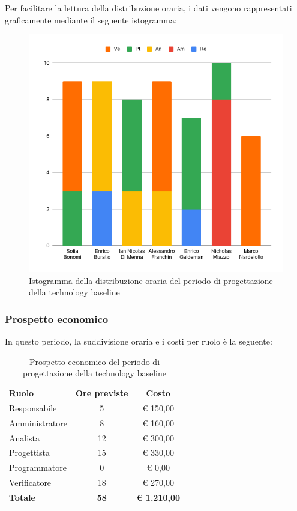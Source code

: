 \documentclass[../piano-di-progetto.tex]{subfiles}
\begin{document}
  Per facilitare la lettura della distribuzione oraria, i dati vengono rappresentati graficamente mediante il seguente istogramma:
  \begin{figure}[H]
    \centering
    \includegraphics[width=12cm]{img/ore-progettazione.png}
    \caption{Istogramma della distribuzione oraria del periodo di progettazione della technology baseline}
    \label{fig:ore-componente-progettazione}
  \end{figure}

  \subsubsection{Prospetto economico}
  In questo periodo, la suddivisione oraria e i costi per ruolo è la seguente:

  \begin{table}[H]
    \centering
    \begin{tabular}{lcc}
      \rowcolor{lightgray}
      \textbf{Ruolo}  & \textbf{Ore previste} & \textbf{Costo}      \\
Responsabile    & 5                     & € 150,00            \\
Amministratore  & 8                     & € 160,00            \\
Analista        & 12                    & € 300,00            \\
Progettista     & 15                    & € 330,00            \\
Programmatore   & 0                     & € 0,00              \\
Verificatore    & 18                    & € 270,00            \\
\textbf{Totale} & \textbf{58}           & \textbf{€ 1.210,00}
    \end{tabular}
    \caption{Prospetto economico del periodo di progettazione della technology baseline}
  \end{table}
\end{document}
